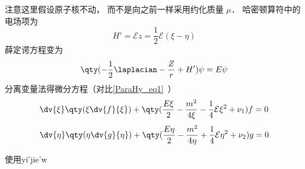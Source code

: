 

注意这里假设原子核不动， 而不是向之前一样采用约化质量 $\mu$． 哈密顿算符中的电场项为
\begin{equation}
H' = \mathcal Ez = \frac12 \mathcal E (\xi - \eta)
\end{equation}
薛定谔方程变为
\begin{equation}
\qty(-\frac12 \laplacian - \frac{Z}{r} + H')\psi = E\psi
\end{equation}
分离变量法得微分方程（对比\autoref{ParaHy_eq1}~）
\begin{equation}
\dv{\xi} \qty(\xi \dv{f}{\xi}) + \qty(\frac{E \xi}{2} - \frac{m^2}{4\xi} -\frac14\mathcal E \xi^2 + \nu_1) f = 0
\end{equation}
\begin{equation}
\dv{\eta}\qty(\eta \dv{g}{\eta}) + \qty(\frac{E\eta}{2} - \frac{m^2}{4\eta} +\frac14\mathcal E \eta^2 + \nu_2)g = 0
\end{equation}

使用yi'jie'w
